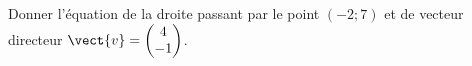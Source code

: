 
\begin{exercice}\label{exosmath-0612}

    Donner l'équation de la droite passant par le point \( (-2;7)\) et de vecteur directeur \( \vect{ v }=\begin{pmatrix}
        4    \\ 
        -1    
    \end{pmatrix}\).

\end{exercice}
